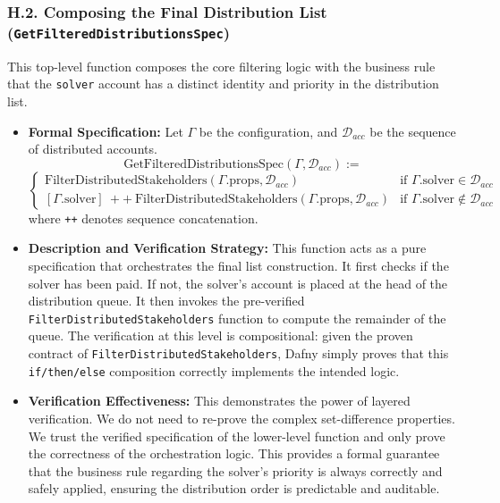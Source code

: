 \documentclass[
  english,
  onecolumn]{article}
\begin{document}
\subsubsection{\texorpdfstring{H.2. Composing the Final Distribution
List
(\texttt{GetFilteredDistributionsSpec})}{H.2. Composing the Final Distribution List (GetFilteredDistributionsSpec)}}\label{h.2.-composing-the-final-distribution-list-getfiltereddistributionsspec}

This top-level function composes the core filtering logic with the
business rule that the \texttt{solver} account has a distinct identity
and priority in the distribution list.

\begin{itemize}
\item
  \textbf{Formal Specification:} Let \(\Gamma\) be the configuration,
  and \(\mathcal{D}_{acc}\) be the sequence of distributed accounts. \[
  \text{GetFilteredDistributionsSpec}(\Gamma, \mathcal{D}_{acc}) :=
  \] \[
  \begin{cases}
  \text{FilterDistributedStakeholders}(\Gamma.\text{props}, \mathcal{D}_{acc}) & \text{if } \Gamma.\text{solver} \in \mathcal{D}_{acc} \\
  [\Gamma.\text{solver}] \ ++ \ \text{FilterDistributedStakeholders}(\Gamma.\text{props}, \mathcal{D}_{acc}) & \text{if } \Gamma.\text{solver} \notin \mathcal{D}_{acc}
  \end{cases}
  \] where \texttt{++} denotes sequence concatenation.
\item
  \textbf{Description and Verification Strategy:} This function acts as
  a pure specification that orchestrates the final list construction. It
  first checks if the solver has been paid. If not, the solver's account
  is placed at the head of the distribution queue. It then invokes the
  pre-verified \texttt{FilterDistributedStakeholders} function to
  compute the remainder of the queue. The verification at this level is
  compositional: given the proven contract of
  \texttt{FilterDistributedStakeholders}, Dafny simply proves that this
  \texttt{if/then/else} composition correctly implements the intended
  logic.
\item
  \textbf{Verification Effectiveness:} This demonstrates the power of
  layered verification. We do not need to re-prove the complex
  set-difference properties. We trust the verified specification of the
  lower-level function and only prove the correctness of the
  orchestration logic. This provides a formal guarantee that the
  business rule regarding the solver's priority is always correctly and
  safely applied, ensuring the distribution order is predictable and
  auditable.
\end{itemize}
\end{document}
